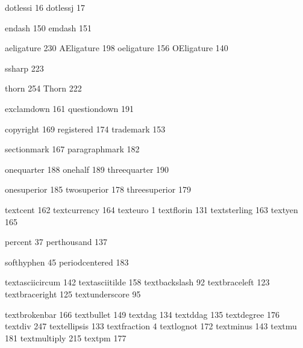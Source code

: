  dotlessi          16 %
 dotlessj          17

 endash           150 %
 emdash           151 %

 aeligature       230
 AEligature       198
 oeligature       156
 OEligature       140

 ssharp           223

 thorn            254
 Thorn            222

 exclamdown       161
 questiondown     191

 copyright        169
 registered       174
 trademark        153

 sectionmark      167
 paragraphmark    182

 onequarter       188
 onehalf          189
 threequarter     190

 onesuperior      185
 twosuperior      178
 threesuperior    179

 textcent         162 %
 textcurrency     164 
 texteuro           1
 textflorin       131
 textsterling     163
 textyen          165 

 percent           37
 perthousand      137

 softhyphen        45 
 periodcentered   183

 textasciicircum  142 
 textasciitilde   158
 textbackslash     92  
 textbraceleft    123 
 textbraceright   125 
 textunderscore    95

 textbrokenbar    166 
 textbullet       149
 textdag          134
 textddag         135
 textdegree       176 
 textdiv          247
 textellipsis     133
 textfraction       4
 textlognot       172
 textminus        143
 textmu           181
 textmultiply     215
 textpm           177

